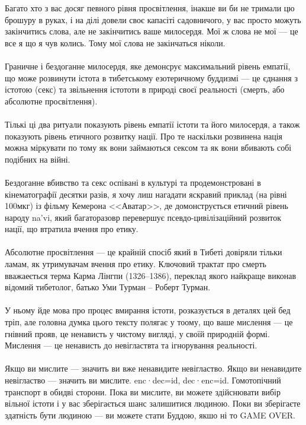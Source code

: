 Багато хто з вас досяг певного рівня просвітлення, інакше ви би не тримали цю брошуру в руках,
і на ділі довели своє капасіті садовничого, у вас просто можуть закінчитись слова, але не закінчитись
ваше милосердя. Мої ж слова не мої --- це все я що я чув колись. Тому мої слова не закінчаться ніколи.
\\
\\
Граничне і бездоганне милосердя, яке демонсрує максимальний рівень емпатії, що може розвинути істота
в тибетському езотеричному буддизмі --- це єднання з істотою (секс) та звільнення істототи в природі
своєї реальності (смерть, або абсолютне просвітлення).
\\
\\
Тількі ці два ритуали показують рівень емпатії істоти та його милосердя, а також показують
рівень етичного розвитку нації. Про те наскільки розвинена нація можна міркувати по тому як
вони займаються сексом та як вони вбивають собі подібних на війні.
\\
\\
Бездоганне вбивство та секс оспівані в культурі та продемонстровані в кінематографії десятки разів,
я хочу лиш нагадати яскравий приклад (на рівні 100мкг) із фільму Кемерона <<Аватар>>, де домонструється
етичний рівень народу  na'vi, який багаторазовр перевершує псевдо-цивілізаційний розвиток нації,
що втратила вчення про етику.
\\
\\
Абсолютне просвітлення --- це крайній спосіб який в Тибеті довіряли тільки ламам,
як утримувачам вчення про етику. Ключовий трактат про смерть вважаеється терма Карма Лінгпи (1326–1386),
переклад якого найкраще виконав відомий тибетолог, батько Уми Турман -- Роберт Турман.
\\
\\
У ньому йде мова про процес вмирання істоти, розказується в деталях цей бед тріп,
але головна думка цього тексту полягає у тоому, що ваше мислення --- це гнівний прояв,
це ненависть у чистому вигляді, у своїй природній формі. Мислення --- це ненависть до невігластвта та
ігнорування реальності.
\\
\\
Якщо ви мислите --- значить ви вже ненавидите невігластво. Якщо ви ненавидите невігластво --- значить ви мислите.
enc·dec=id, dec·enc=id. Гомотопічний транспорт в обидві сторони. Пока ви мислите, ви можете
здійснювати вибір вільної істоти і у вас зберігається шанс залишитися людиною. Поки ви зберігаєте
здатність бути людиною --- ви можете стати Буддою, якшо ні то GAME OVER.
